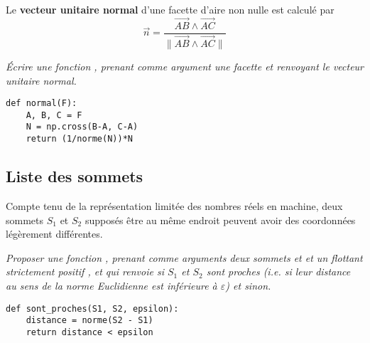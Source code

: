 \medskip

Le {\bf vecteur unitaire normal} d'une facette  d'aire non nulle est calculé  par  \[ \vec n =\frac{\overrightarrow{AB} \wedge \overrightarrow{AC}}{\bigl\|\overrightarrow{AB} \wedge \overrightarrow{AC}\bigr\|}\]
\begin{Exercise}\it 
Écrire une fonction , prenant comme argument une facette  et renvoyant le vecteur unitaire normal.
\end{Exercise}
\begin{Answer}
\begin{lstlisting}
def normal(F):
    A, B, C = F
    N = np.cross(B-A, C-A)
    return (1/norme(N))*N
\end{lstlisting}
\end{Answer}
\subsection{Liste des sommets} 
Compte tenu de la représentation limitée des nombres réels en machine, deux sommets $S_1$ et $S_2$ supposés être au même endroit peuvent avoir des coordonnées légèrement différentes. 
\begin{Exercise}\it 
Proposer une fonction , prenant comme arguments deux sommets  et  et un flottant strictement positif , et qui renvoie  si $S_1$ et $S_2$ sont proches (i.e. si leur distance au sens de la norme Euclidienne est inférieure à $\varepsilon$) et  sinon.
\end{Exercise}
\begin{Answer}
\begin{lstlisting}
def sont_proches(S1, S2, epsilon):
    distance = norme(S2 - S1)
    return distance < epsilon
\end{lstlisting}
\end{Answer}

